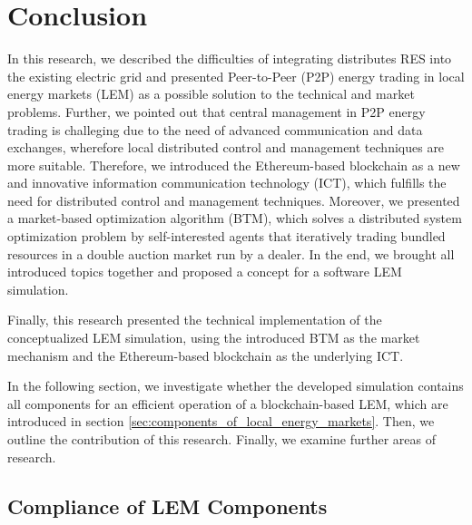 \section{Conclusion}
In this research, we described the difficulties of integrating distributes RES into 
the existing electric grid and presented Peer-to-Peer (P2P) energy trading in local energy markets (LEM)
as a possible solution to the technical and market problems. Further, we pointed out that central
management in P2P energy trading is challeging due to the need of advanced communication and data exchanges,
wherefore local distributed control and management techniques are more suitable.
Therefore, we introduced the Ethereum-based blockchain as a new and innovative information communication
technology (ICT), which fulfills the need for distributed control and management techniques.
Moreover, we presented a market-based optimization algorithm (BTM), which solves a distributed system
optimization problem by self-interested agents that iteratively trading bundled resources in a double
auction market run by a dealer. 
In the end, we brought all introduced topics together and proposed a concept for a software 
LEM simulation.

Finally, this research presented the technical implementation of the conceptualized
LEM simulation, using the introduced BTM as the market mechanism and 
the Ethereum-based blockchain as the underlying ICT.

In the following section, we investigate whether the developed simulation contains all 
components for an efficient operation of a blockchain-based LEM, which are introduced in section \ref{sec:components_of_local_energy_markets}. 
Then, we outline the contribution of this research. Finally, we examine further areas of research.

\subsection{Compliance of LEM Components}
\label{sec:compliance_of_components}

